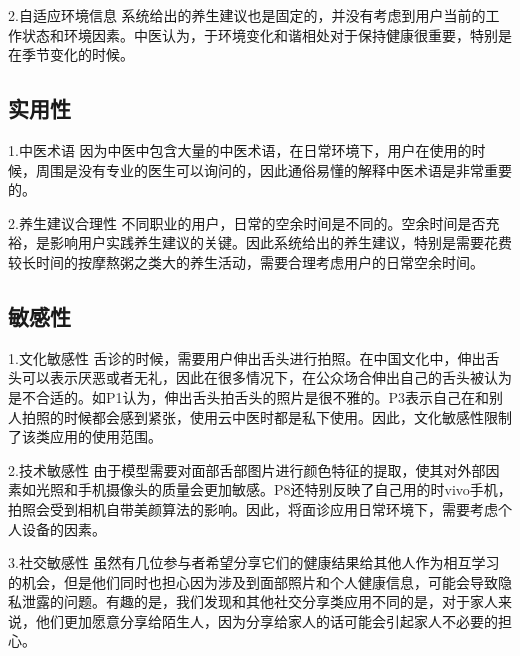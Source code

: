 2.自适应环境信息
系统给出的养生建议也是固定的，并没有考虑到用户当前的工作状态和环境因素。中医认为，于环境变化和谐相处对于保持健康很重要，特别是在季节变化的时候。
\subsection{实用性}
1.中医术语
 因为中医中包含大量的中医术语，在日常环境下，用户在使用的时候，周围是没有专业的医生可以询问的，因此通俗易懂的解释中医术语是非常重要的。
 
2.养生建议合理性
不同职业的用户，日常的空余时间是不同的。空余时间是否充裕，是影响用户实践养生建议的关键。因此系统给出的养生建议，特别是需要花费较长时间的按摩熬粥之类大的养生活动，需要合理考虑用户的日常空余时间。
\subsection{敏感性}
1.文化敏感性
舌诊的时候，需要用户伸出舌头进行拍照。在中国文化中，伸出舌头可以表示厌恶或者无礼，因此在很多情况下，在公众场合伸出自己的舌头被认为是不合适的。如P1认为，伸出舌头拍舌头的照片是很不雅的。P3表示自己在和别人拍照的时候都会感到紧张，使用云中医时都是私下使用。因此，文化敏感性限制了该类应用的使用范围。

2.技术敏感性
由于模型需要对面部舌部图片进行颜色特征的提取，使其对外部因素如光照和手机摄像头的质量会更加敏感。P8还特别反映了自己用的时vivo手机，拍照会受到相机自带美颜算法的影响。因此，将面诊应用日常环境下，需要考虑个人设备的因素。

3.社交敏感性
虽然有几位参与者希望分享它们的健康结果给其他人作为相互学习的机会，但是他们同时也担心因为涉及到面部照片和个人健康信息，可能会导致隐私泄露的问题。有趣的是，我们发现和其他社交分享类应用不同的是，对于家人来说，他们更加愿意分享给陌生人，因为分享给家人的话可能会引起家人不必要的担心。
